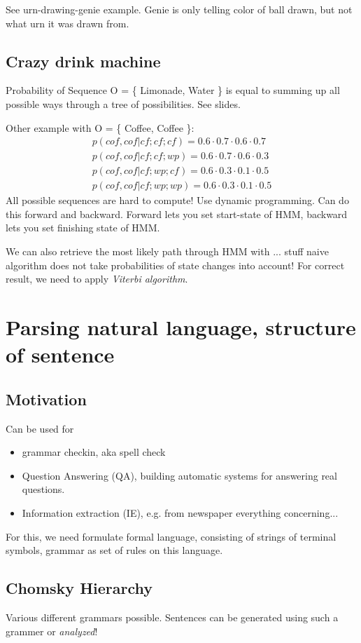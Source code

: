 \documentclass[11pt]{article}
\begin{document}
See urn-drawing-genie example. Genie is only telling color of ball drawn, but not what urn
it was drawn from. 

\subsection{Crazy drink machine}
Probability of Sequence O = \{ Limonade, Water \} is equal to summing up all possible ways
through a tree of possibilities. See slides.

Other example with O =  \{ Coffee, Coffee \}:
\begin{eqnarray*}
	p(cof, cof | cf; cf; cf) = 0.6 \cdot 0.7\cdot 0.6 \cdot 0.7 \\
	p(cof, cof | cf; cf; wp) = 0.6 \cdot 0.7\cdot 0.6\cdot0.3 \\
	p(cof, cof | cf; wp; cf) = 0.6 \cdot 0.3\cdot 0.1\cdot 0.5 \\
	p(cof, cof | cf; wp; wp) = 0.6 \cdot 0.3\cdot 0.1\cdot 0.5
\end{eqnarray*}
All possible sequences are hard to compute! Use dynamic programming. Can do this forward
and backward. Forward lets you set start-state of HMM, backward lets you set finishing
state of HMM.

We can also retrieve the most likely path through HMM with ... stuff naive algorithm does
 not take probabilities of state changes into account! For correct result, we need to
 apply \emph{Viterbi algorithm}.
 
\section{Parsing natural language, structure of sentence}
\subsection{Motivation}
Can be used for 
\begin{itemize}
	\item grammar checkin, aka spell check
	\item Question Answering (QA), building automatic systems for answering real questions.
	\item Information extraction (IE), e.g. from newspaper everything concerning...
\end{itemize} 
For this, we need formulate formal language, consisting of strings of terminal symbols,
grammar as set of rules on this language.

\subsection{Chomsky Hierarchy}
Various different grammars possible. Sentences can be generated using such a grammer or \emph{analyzed}!
\end{document}
